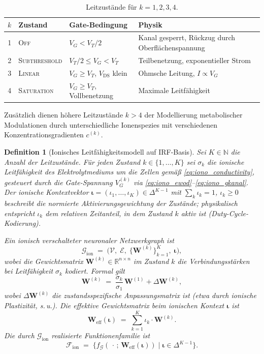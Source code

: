 \documentclass[12pt, a4paper, openany]{report}
\newtheorem{definition}[theorem]{Definition}
\newcommand{\R}{\mathbb{R}}
\newcommand{\N}{\mathbb{N}}
\newcommand{\calG}{\mathcal{G}}
\newcommand{\calV}{\mathcal{V}}
\newcommand{\calE}{\mathcal{E}}
\newcommand{\calF}{\mathcal{F}}
\begin{document}
\begin{table}
	\centering
	\begin{tabular}{clll}
		\toprule
		$k$ & Zustand & Gate-Bedingung & Physik \\
		\midrule
		1 & \textsc{Off} & $V_G < V_T/2$ & Kanal gesperrt, Rückzug durch Oberflächenspannung \\
		2 & \textsc{Subthreshold} & $V_T/2 \leq V_G < V_T$ & Teilbenetzung, exponentieller Strom \\
		3 & \textsc{Linear} & $V_G \geq V_T$, $V_\mathrm{DS}$ klein & Ohmsche Leitung, $I \propto V_G$ \\
		4 & \textsc{Saturation} & $V_G \geq V_T$, Vollbenetzung & Maximale Leitfähigkeit \\
		\bottomrule
	\end{tabular}
	\label{tab:Leitzustaende}
	\caption{Leitzustände für $k = 1, 2, 3, 4$.}
\end{table}

\noindent Zusätzlich dienen höhere Leitzustände $k > 4$ der Modellierung
metabolischer Modulationen durch unterschiedliche Ionenspezies mit
versch\-iedenen Konzentrationsgradienten $c^{(k)}$.

\begin{definition}[Ionisches Leitfähigkeitsmodell auf IRF-Basis]
\label{def:ionic_conductance}
Sei $K \in \N$ die Anzahl der Leitzustände.  Für jeden Zustand $k \in
\{1,\ldots,K\}$ sei $\sigma_k$ die ionische Leitfähigkeit des
Elektrolytmediums um die Zellen gemäß \eqref{eq:iono_conductivity},
gesteuert durch die Gate-Span\-nung $V_G^{(k)}$ via
\eqref{eq:iono_ewod}--\eqref{eq:iono_gkanal}.  Der
\emph{ionische Kontextvektor}
$\bm{\iota} = (\iota_1, \ldots, \iota_K) \in \Delta^{K-1}$
mit $\sum_k \iota_k = 1$, $\iota_k \geq 0$
beschreibt die normierte Aktivierungsgewichtung der Zustände; physikalisch
entspricht $\iota_k$ dem relativen Zeitanteil, in dem Zustand $k$ aktiv ist
(Duty-Cycle-Kodierung).

Ein \emph{ionisch verschalteter neuronaler Netzwerkgraph} ist
\[
  \calG_{\mathrm{ion}}
  \;=\;
  \bigl(\calV,\; \calE,\; \{\bm{W}^{(k)}\}_{k=1}^K,\; \bm{\iota}\bigr),
\]
wobei die Gewichtsmatrix $\bm{W}^{(k)} \in \R^{n \times n}$ im Zustand $k$
die Verbindungsstärken bei Leitfähigkeit $\sigma_k$ kodiert.
Formal gilt
\begin{equation}
  \label{eq:ionic_weight_scaling}
  \bm{W}^{(k)} \;=\; \frac{\sigma_k}{\sigma_1}\,\bm{W}^{(1)} +\Delta\bm{W}^{(k)},
\end{equation}
wobei $\Delta\bm{W}^{(k)}$ die zustandsspezifische Anpassungsmatrix ist
(etwa durch ionische Plastizität, s.\,u.).  Die \emph{effektive Gewichtsmatrix}
beim ionischen Kontext $\bm{\iota}$ ist
\begin{equation}
  \label{eq:ionic_weight}
  \bm{W}_{\mathrm{eff}}(\bm{\iota})
  \;=\;
  \sum_{k=1}^{K} \iota_k \cdot \bm{W}^{(k)}.
\end{equation}
Die durch $\calG_{\mathrm{ion}}$ realisierte Funktionenfamilie ist
\[
  \calF_{\mathrm{ion}}
  \;=\;
  \bigl\{f_{\calG}(\,\cdot\,;\, \bm{W}_{\mathrm{eff}}(\bm{\iota})) \;\big|\;
         \bm{\iota} \in \Delta^{K-1}\bigr\}.
\]
\end{definition}
\end{document}
